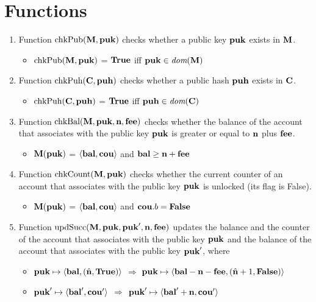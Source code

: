 \documentclass[a4paper]{llncs}
\begin{document}
\section{Functions}
\begin{enumerate}
    \item Function $\textup{chkPub}(\textbf{M}, \textbf{puk})$ checks whether a public key $\textbf{puk}$ exists in $\textbf{M}$.
    \begin{itemize}
    \item[] $\textup{chkPub}(\textbf{M}, \textbf{puk})$ = $\textbf{True}$ iff $\textbf{puk} \in \textit{dom}(\textbf{M})$
    \end{itemize}
    \item Function $\textup{chkPuh}(\textbf{C}, \textbf{puh})$ checks whether a public hash $\textbf{puh}$ exists in $\textbf{C}$.
     \begin{itemize}
    \item[] $\textup{chkPuh}(\textbf{C}, \textbf{puh})$ = $\textbf{True}$ iff $\textbf{puh} \in \textit{dom}(\textbf{C})$
    \end{itemize}
    \item Function $\textup{chkBal} (\textbf{M}, \textbf{puk}, \textbf{n}, \textbf{fee})$ checks whether the balance of the account that associates with the public key $\textbf{puk}$ is greater or equal to $\textbf{n}$ plus $\textbf{fee}$.
    \begin{itemize}
    \item[] $\textbf{M}(\textbf{puk})$ = $\langle\textbf{bal}, \textbf{cou}\rangle$ and $\textbf{bal} \ge \textbf{n} + \textbf{fee}$
    \end{itemize}
    \item Function $\textup{chkCount} (\textbf{M}, \textbf{puk})$ checks whether the current counter of an account that associates with the public key $\textbf{puk}$ is unlocked (its flag is False).
    \begin{itemize}
    \item[] $\textbf{M}(\textbf{puk})$ = $\langle\textbf{bal}, \textbf{cou}\rangle$ and $\textbf{cou}.b = \textbf{False}$
    \end{itemize}
    \item Function $\textup{updSucc}(\textbf{M}, \textbf{puk}, \textbf{puk}', \textbf{n}, \textbf{fee})$ updates the balance and the counter of the account that associates with the public key $\textbf{puk}$ and the balance of the account that associates with the public key $\textbf{puk}'$, where
    \begin{itemize}
        \item[]  $\textbf{puk} \mapsto \langle\textbf{bal}, (\hat{\textbf{n}}, \textbf{True})\rangle$ $\Rightarrow$ $ \textbf{puk} \mapsto \langle\textbf{bal} - \textbf{n} - \textbf{fee}, (\hat{\textbf{n}} + 1, \textbf{False})\rangle$     
        \item[] $\textbf{puk}' \mapsto \langle  \textbf{bal}', \textbf{cou}' \rangle$ $\Rightarrow$ $\textbf{puk}' \mapsto \langle \textbf{bal}' + \textbf{n}, \textbf{cou}' \rangle $         
    \end{itemize}
    

\end{enumerate}
\end{document}
